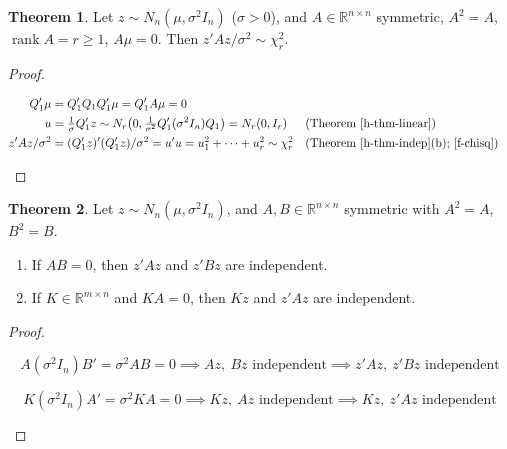 \documentclass[12pt]{article}
\newcommand{\R}{\mathbb R}
\DeclareMathOperator{\rank}{rank}
\theoremstyle{definition}
\newtheorem{theorem}{Theorem}
\newcommand{\boardtop}{\vspace*{-\abovedisplayskip}}
\begin{document}
\begin{theorem}\label{h-thm-quadratic-chisq}
Let \(z\sim N_n(\mu,\sigma^2I_n)\) (\(\sigma>0\)), and \(A\in\R^{n\times n}\) symmetric, \(A^2=A\), \(\rank A=r\geqslant1\),
\(A\mu=0\). Then \(z'Az/\sigma^2\sim\chi^2_r\).
\end{theorem}
\begin{proof}
\begin{board}[\(A'=A=A^2\), so \(A=P_W\), the projection matrix for \(W=\mathcal C(A)\) (\lec{8}, \lit{Theorem~4}(c)), and
\(\dim W=\rank A=r\geqslant1\) (\lec{4}, \lit{Definition~10}: \(\rank A=\dim\mathcal C(A)\)); let the columns of
\(Q_1\in\R^{n\times r}\) form an orthonormal basis of \(W\) (\lec{6}, \lit{Corollary~11}(a): one exists); then \(Q_1'Q_1=I_r\)
(\lec{6}, \lit{Definition~8}) and \(A=P_W=Q_1Q_1'\) (\lec{8}, \lit{Theorem~4}(a)):]
\boardtop
\begin{align*}
Q_1'\mu&=Q_1'Q_1Q_1'\mu=Q_1'A\mu=0\\
u&=\tfrac1\sigma Q_1'z\sim N_r\bigl(0,\tfrac1{\sigma^2}Q_1'(\sigma^2I_n)Q_1\bigr)=N_r(0,I_r)&&\text{(Theorem~\ref{h-thm-linear})}\\
z'Az/\sigma^2&=(Q_1'z)'(Q_1'z)/\sigma^2=u'u=u_1^2+\dots+u_r^2\sim\chi^2_r
&&\text{(Theorem~\ref{h-thm-indep}(b); \ref{f-chisq})}
\end{align*}
\end{board}
\nopagebreak
\end{proof}

\begin{theorem}\label{h-thm-quadratic-indep}
Let \(z\sim N_n(\mu,\sigma^2I_n)\), and \(A,B\in\R^{n\times n}\) symmetric with \(A^2=A\), \(B^2=B\).
\begin{enumerate}
\item If \(AB=0\), then \(z'Az\) and \(z'Bz\) are independent.
\item If \(K\in\R^{m\times n}\) and \(KA=0\), then \(Kz\) and \(z'Az\) are independent.
\end{enumerate}
\end{theorem}
\begin{proof}
\begin{board}[(a) \(A'A=A^2=A\): \(z'Az=z'A'Az=(Az)'(Az)\), a function of \(Az\); likewise \(z'Bz=(Bz)'(Bz)\);
Theorem~\ref{h-thm-indep}(c), \ref{f-indep}:]
\[
A(\sigma^2I_n)B'=\sigma^2AB=0\implies Az,\ Bz\text{ independent}\implies z'Az,\ z'Bz\text{ independent}
\]
\end{board}
\begin{board}[(b) \(z'Az=(Az)'(Az)\) as in (a); Theorem~\ref{h-thm-indep}(c), \ref{f-indep}:]
\[
K(\sigma^2I_n)A'=\sigma^2KA=0\implies Kz,\ Az\text{ independent}\implies Kz,\ z'Az\text{ independent}
\]
\end{board}
\nopagebreak
\end{proof}
\end{document}
